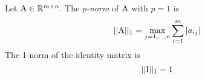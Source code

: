 \begin{example}
    Let $\mathrm{A} \in \mathbb{R}^{m \times n}$. The \textit{p-norm} of $\mathrm{A}$ with $p = 1$ is
    $$ ||\mathrm{A}||_1 = \max_{j = 1, \hdots, n}{\sum_{i=1}^{m}{|a_{ij}|}} $$
    The 1-norm of the identity matrix is
    $$ ||\mathrm{I}||_1 = 1 $$
\end{example}